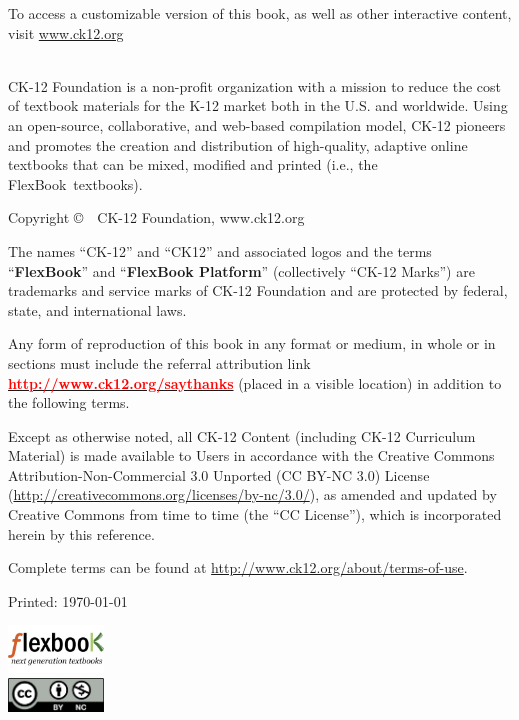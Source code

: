 {
  \setlength{\parindent}{0pt}
  \setlength{\parskip}{\baselineskip}

\begin{sloppypar}

  To access a customizable version of this book,
  as well as other interactive content,
  visit \href{http://www.ck12.org/}{www.ck12.org} \\

  ~\vfill

  CK-12 Foundation is a non-profit organization with a mission to reduce the cost 
  of textbook materials for the K-12 market both in the U.S. and worldwide. Using an open-source, 
  collaborative, and web-based compilation model, CK-12 pioneers and promotes the 
  creation and distribution of high-quality, adaptive online textbooks that can be mixed, 
  modified and printed (i.e., the FlexBook\textregistered\ textbooks). 

  Copyright \copyright\ \the\year\ CK-12 Foundation, www.ck12.org

  The names ``CK-12'' and ``CK12'' and associated logos and the terms ``\textbf{FlexBook}\textregistered'' and
  ``\textbf{FlexBook Platform}\textregistered'' (collectively ``CK-12 Marks'') are trademarks and service marks of
  CK-12 Foundation and are protected by federal, state, and international laws.

  Any form of reproduction of this book in any format or medium, in whole or in sections
  must include the referral attribution link \href{http://www.ck12.org/saythanks}{\textcolor{red}{\textbf{http://www.ck12.org/saythanks}}} (placed in a
  visible location) in addition to the following terms.

  Except as otherwise noted, all CK-12 Content (including CK-12 Curriculum
  Material) is made available to Users in accordance with the Creative
  Commons Attribution-Non-Commercial 3.0 Unported (CC BY-NC 3.0)
  License (\url{http://creativecommons.org/licenses/by-nc/3.0/}), as
  amended and updated by Creative Commons from time to time (the ``CC License''),
  which is incorporated herein by this reference.

  Complete terms can be found at \url{http://www.ck12.org/about/terms-of-use}.
  \end{sloppypar}

  Printed: \today

  \includegraphics[width=1in]{flexbooks.jpg}\\
  \includegraphics[width=1in]{ccbync.png}
}
